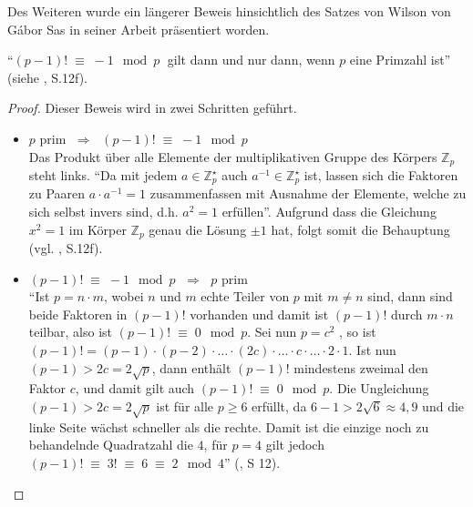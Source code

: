 Des Weiteren wurde ein längerer Beweis hinsichtlich
des Satzes von Wilson von Gábor Sas in seiner Arbeit
präsentiert worden.

\begin{theorem}[Wilson]
``$(p-1)! \;\equiv\; -1\mod p\;$ gilt dann und nur dann,
wenn $p$ eine Primzahl ist'' (siehe \cite{sasgabor}, S.12f).
\end{theorem}
\vspace{-.7cm}

\begin{proof}
  Dieser Beweis wird in zwei Schritten geführt.
  \begin{itemize}
    \item $p$ prim $\;\Rightarrow\;$ $(p-1)! \;\equiv\; -1 \mod p$\\
          Das Produkt über alle Elemente der multiplikativen Gruppe
          des Körpers $\mathbb{Z}_{p}$ steht links. ``Da mit jedem
          $a \in \mathbb{Z}_{p}^{\star}$ auch
          $a^{-1}\in\mathbb{Z}_{p}^{\star}$ ist, lassen sich die
          Faktoren zu Paaren $a\cdot a^{-1} = 1$ zusammenfassen
          mit Ausnahme der Elemente, welche zu sich selbst invers
          sind, d.h. $a^2 = 1$ erfüllen''. Aufgrund dass die
          Gleichung $x^2 = 1$ im Körper $\mathbb{Z}_{p}$ genau
          die Lösung $\pm 1$ hat, folgt somit die Behauptung
          (vgl. \cite{sasgabor}, S.12f).
          
    \item $(p-1)! \;\equiv\; -1\mod p$ $\;\Rightarrow\;$ $p$ prim\\
          ``Ist $p=n\cdot m$, wobei $n$ und $m$ echte Teiler von $p$
          mit $m \neq n$ sind, dann sind beide Faktoren in
          $(p-1)!$ vorhanden und damit ist $(p-1)!$ durch $m\cdot n$
          teilbar, also ist $(p-1)! \;\equiv\; 0 \mod p$.
          Sei nun $p=c^2$ , so ist
          $(p-1)! = (p-1)\cdot (p-2)\cdot \dotsc \cdot (2c)\cdot \dotsc
          \cdot c \cdot \dotsc \cdot 2 \cdot 1$.
          Ist nun $(p-1) > 2c = 2\sqrt{p}$,
          dann enthält $(p-1)!$ mindestens zweimal den Faktor $c$,
          und damit gilt auch $(p-1)! \;\equiv\; 0 \mod p$.
          Die Ungleichung $(p-1) > 2c = 2 \sqrt{p}$ ist für alle
          $p \geq 6$ erfüllt, da $6-1 > 2 \sqrt{6} \approx 4,9$
          und die linke Seite wächst schneller als die rechte.
          Damit ist die einzige noch zu behandelnde Quadratzahl
          die $4$, für $p = 4$ gilt jedoch $(p-1)! \;\equiv\;
          3! \;\equiv\; 6 \;\equiv\; 2 \mod 4$''
          (\cite{sasgabor}, S 12).
  \end{itemize}
\end{proof}

